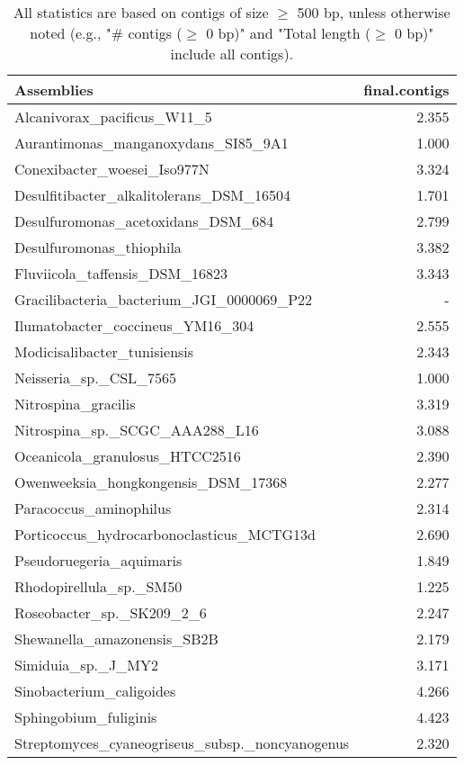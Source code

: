 \documentclass[12pt,a4paper]{article}
\begin{document}
\begin{table}[ht]
\begin{center}
\caption{All statistics are based on contigs of size $\geq$ 500 bp, unless otherwise noted (e.g., "\# contigs ($\geq$ 0 bp)" and "Total length ($\geq$ 0 bp)" include all contigs).}
\begin{tabular}{|l*{1}{|r}|}
\hline
Assemblies & final.contigs \\ \hline
Alcanivorax\_pacificus\_W11\_5 & 2.355 \\ \hline
Aurantimonas\_manganoxydans\_SI85\_9A1 & 1.000 \\ \hline
Conexibacter\_woesei\_Iso977N & 3.324 \\ \hline
Desulfitibacter\_alkalitolerans\_DSM\_16504 & 1.701 \\ \hline
Desulfuromonas\_acetoxidans\_DSM\_684 & 2.799 \\ \hline
Desulfuromonas\_thiophila & 3.382 \\ \hline
Fluviicola\_taffensis\_DSM\_16823 & 3.343 \\ \hline
Gracilibacteria\_bacterium\_JGI\_0000069\_P22 & - \\ \hline
Ilumatobacter\_coccineus\_YM16\_304 & 2.555 \\ \hline
Modicisalibacter\_tunisiensis & 2.343 \\ \hline
Neisseria\_sp.\_CSL\_7565 & 1.000 \\ \hline
Nitrospina\_gracilis & 3.319 \\ \hline
Nitrospina\_sp.\_SCGC\_AAA288\_L16 & 3.088 \\ \hline
Oceanicola\_granulosus\_HTCC2516 & 2.390 \\ \hline
Owenweeksia\_hongkongensis\_DSM\_17368 & 2.277 \\ \hline
Paracoccus\_aminophilus & 2.314 \\ \hline
Porticoccus\_hydrocarbonoclasticus\_MCTG13d & 2.690 \\ \hline
Pseudoruegeria\_aquimaris & 1.849 \\ \hline
Rhodopirellula\_sp.\_SM50 & 1.225 \\ \hline
Roseobacter\_sp.\_SK209\_2\_6 & 2.247 \\ \hline
Shewanella\_amazonensis\_SB2B & 2.179 \\ \hline
Simiduia\_sp.\_J\_MY2 & 3.171 \\ \hline
Sinobacterium\_caligoides & 4.266 \\ \hline
Sphingobium\_fuliginis & 4.423 \\ \hline
Streptomyces\_cyaneogriseus\_subsp.\_noncyanogenus & 2.320 \\ \hline

\end{tabular}
\end{center}
\end{table}
\end{document}

